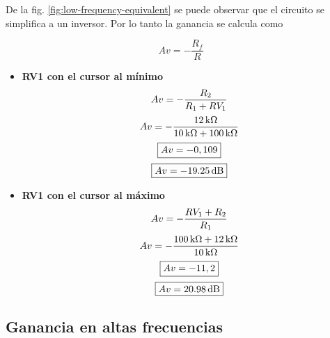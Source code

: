 \documentclass{article}
\begin{document}
De la fig. \ref{fig:low-frequency-equivalent} se puede observar que el circuito
se simplifica a un inversor. Por lo tanto la ganancia se calcula como

\begin{equation*}
    Av = - \frac{R_f}{R}
\end{equation*}

\begin{itemize}
    \item \textbf{RV1 con el cursor al mínimo}
        \[
        \begin{gathered}
            Av = - \frac{R_2}{R_1 + RV_{1}} \\[2pt]
            Av = - \frac{\SI{12}{\kilo\ohm}}{\SI{10}{\kilo\ohm} + \SI{100}{\kilo\ohm}} \\[2pt]
            \boxed{Av = -0,109} \\[2pt]
            \boxed{Av = \SI{-19{,}25}{\decibel}}
        \end{gathered}
        \]
    \item \textbf{RV1 con el cursor al máximo}
        \[
        \begin{gathered}
            Av = - \frac{RV_1 + R_2}{R_1} \\[2pt]
            Av = - \frac{\SI{100}{\kilo\ohm} + \SI{12}{\kilo\ohm}}{\SI{10}{\kilo\ohm}} \\[2pt]
            \boxed{Av = -11,2} \\[2pt]
            \boxed{Av = \SI{20{,}98}{\decibel}}
        \end{gathered}
        \]
\end{itemize}

\subsection{Ganancia en altas frecuencias}
\end{document}
